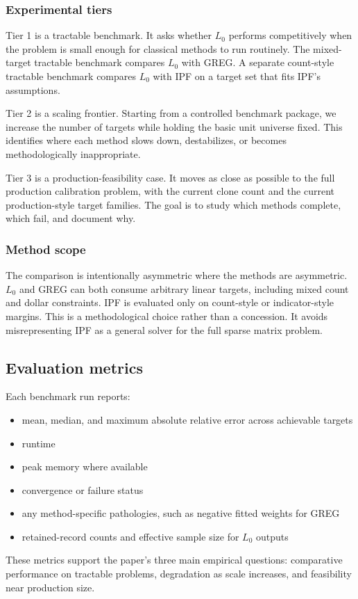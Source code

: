 \subsubsection{Experimental tiers}

Tier 1 is a tractable benchmark. It asks whether $L_0$ performs competitively when the problem is
small enough for classical methods to run routinely. The mixed-target tractable benchmark compares
$L_0$ with GREG. A separate count-style tractable benchmark compares $L_0$ with IPF on a target set
that fits IPF's assumptions.

Tier 2 is a scaling frontier. Starting from a controlled benchmark package, we increase the number
of targets while holding the basic unit universe fixed. This identifies where each method slows
down, destabilizes, or becomes methodologically inappropriate.

Tier 3 is a production-feasibility case. It moves as close as possible to the full production
calibration problem, with the current clone count and the current production-style target families.
The goal is to study which methods complete,
which fail, and document why.

\subsubsection{Method scope}

The comparison is intentionally asymmetric where the methods are asymmetric. $L_0$ and GREG can
both consume arbitrary linear targets, including mixed count and dollar constraints. IPF is
evaluated only on count-style or indicator-style margins. This is a methodological choice rather
than a concession. It avoids misrepresenting IPF as a general solver for the full sparse matrix
problem.

\subsection{Evaluation metrics}
\label{sec:metrics}

Each benchmark run reports:

\begin{itemize}
    \item mean, median, and maximum absolute relative error across achievable targets
    \item runtime
    \item peak memory where available
    \item convergence or failure status
    \item any method-specific pathologies, such as negative fitted weights for GREG
    \item retained-record counts and effective sample size for $L_0$ outputs
\end{itemize}

These metrics support the paper's three main empirical questions: comparative performance on
tractable problems, degradation as scale increases, and feasibility near production size.
